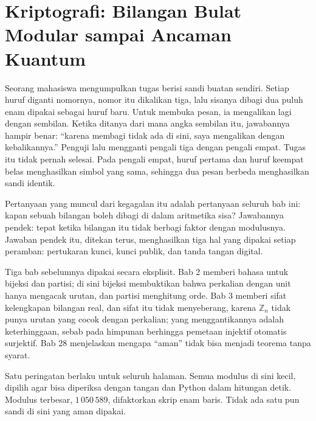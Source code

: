 \chapter[Kriptografi: Modular sampai Kuantum]{Kriptografi: Bilangan Bulat Modular sampai Ancaman Kuantum}

Seorang mahasiswa mengumpulkan tugas berisi sandi buatan sendiri. Setiap huruf diganti nomornya,
nomor itu dikalikan tiga, lalu sisanya dibagi dua puluh enam dipakai sebagai huruf baru. Untuk
membuka pesan, ia mengalikan lagi dengan sembilan. Ketika ditanya dari mana angka sembilan itu,
jawabannya hampir benar: ``karena membagi tidak ada di sini, saya mengalikan dengan
kebalikannya.'' Penguji lalu mengganti pengali tiga dengan pengali empat. Tugas itu tidak pernah
selesai. Pada pengali empat, huruf pertama dan huruf keempat belas menghasilkan simbol yang
sama, sehingga dua pesan berbeda menghasilkan sandi identik.

Pertanyaan yang muncul dari kegagalan itu adalah pertanyaan seluruh bab ini: kapan sebuah
bilangan boleh dibagi di dalam aritmetika sisa? Jawabannya pendek: tepat ketika bilangan itu
tidak berbagi faktor dengan modulusnya. Jawaban pendek itu, ditekan terus, menghasilkan tiga hal
yang dipakai setiap peramban: pertukaran kunci, kunci publik, dan tanda tangan digital.

Tiga bab sebelumnya dipakai secara eksplisit. Bab 2 memberi bahasa untuk bijeksi dan partisi;
di sini bijeksi membuktikan bahwa perkalian dengan unit hanya mengacak urutan, dan partisi
menghitung orde. Bab 3 memberi sifat kelengkapan bilangan real, dan sifat itu tidak menyeberang,
karena $\mathbb{Z}_n$ tidak punya urutan yang cocok dengan perkalian; yang menggantikannya
adalah keterhinggaan, sebab pada himpunan berhingga pemetaan injektif otomatis surjektif. Bab 28
menjelaskan mengapa ``aman'' tidak bisa menjadi teorema tanpa syarat.

Satu peringatan berlaku untuk seluruh halaman. Semua modulus di sini kecil, dipilih agar bisa
diperiksa dengan tangan dan Python dalam hitungan detik. Modulus terbesar, $1\,050\,589$,
difaktorkan skrip enam baris. Tidak ada satu pun sandi di sini yang aman dipakai.


